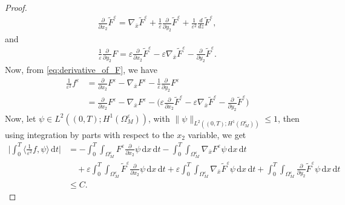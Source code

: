 \documentclass[11pt]{article}
\def\es{\varepsilon}
\def\omm{\Omega_M^\varepsilon}
\def\p{\partial}
\newcommand{\di}[1]{\,\mathrm{d}#1}
\begin{document}
\begin{proof}
    \begin{align*}
        \frac{\p}{\p x_2}\widetilde{F}^\es=\nabla_{\bar x} \widetilde{F}^\es+\frac{1}{\es}\frac{\p}{\p y_2}\widetilde{F}^\es+\frac{1}{\es^2}\frac{d}{dz}\widetilde{F}^\es,
    \end{align*}
    and
    \begin{align*}
        \frac{1}{\es} \frac{\p}{\p y_2}F=\es \frac{\p}{\p x_2}\widetilde{F}^\es-\es \nabla_{\bar x} \widetilde{F}^\es -\frac{\p}{\p y_2}\widetilde{F}^\es.
    \end{align*}
Now, from \eqref{eq:derivative_of_F}, we have
\begin{align*}
\frac{1}{\es^2}f^\es&= \frac{\p}{\p x_2}F^\es-\nabla_{\bar x} F^\es - \frac{1}{\es}\frac{\p}{\p y_2}F^\es\\
&=\frac{\p}{\p x_2}F^\es-\nabla_{\bar x} F^\es -\Big(\es \frac{\p}{\p x_2}\widetilde{F}^\es-\es \nabla_{\bar x} \widetilde{F}^\es -\frac{\p}{\p y_2}\widetilde{F}^\es\Big)
\end{align*}
    Now, let $\psi\in L^2((0,T);H^1(\Omega_M^\es))$, with $\|\psi\|_{L^2((0,T);H^1(\Omega_M^\es))}\leq 1$,  then using integration by parts with respect to the $x_2$ variable, we get
    \begin{align*}
        \Big|\int_0^T\Big\langle \frac{1}{\es^2}f,\psi\Big\rangle \di{t}\Big|&=-\int_0^T\int_{\omm} F^\es \frac{\p}{\p x_2}\psi\di{x}\di{t}- \int_0^T\int_{\omm} \nabla_{\bar x} F^\es\psi\di{x}\di{t}\\
        &\quad+\es\int_0^T\int_{\omm} \widetilde{F}^\es \frac{\p}{\p x_2}\psi\di{x}\di{t}+\es \int_0^T\int_{\omm} \nabla_{\bar x} \widetilde{F}^\es \psi\di{x}\di{t}+ \int_0^T\int_{\omm} \frac{\p}{\p y_2}\widetilde{F}^\es \psi\di{x}\di{t}\\
        &\leq C.
    \end{align*}
    
\end{proof}
\end{document}
